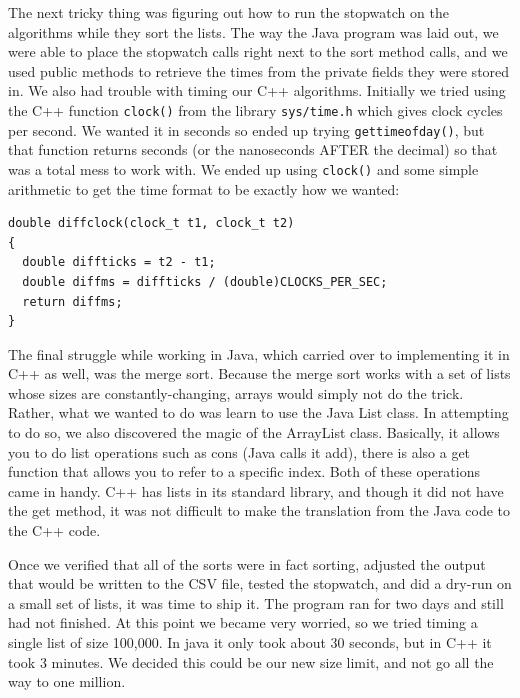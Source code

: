 \documentclass[12pt]{amsart}
\begin{document}
The next tricky thing was figuring out how to run the stopwatch on the 
algorithms while they sort the lists. The way the Java program was laid out, we were able to place the stopwatch calls right next to the sort method calls, and we used public methods to retrieve the times from the private fields they were stored in. We also had trouble with timing our C++ algorithms. Initially we tried using the C++ function \texttt{clock()} from the library \texttt{sys/time.h} which gives clock cycles per second. We wanted it in seconds so ended up trying \texttt{gettimeofday()}, but that function returns seconds (or the nanoseconds AFTER the decimal) so that was a total mess to work with. We ended up using \texttt{clock()} and some simple arithmetic to get the time format to be exactly how we wanted:
\linespread{1}
\begin{verbatim}
double diffclock(clock_t t1, clock_t t2)
{
  double diffticks = t2 - t1;
  double diffms = diffticks / (double)CLOCKS_PER_SEC;
  return diffms;
}
\end{verbatim}
\linespread{1.5}
The final struggle while working in Java, which carried over to implementing it
in C++ as well, was the merge sort. Because the merge sort works with a set of
lists whose sizes are constantly-changing, arrays would simply not do the trick.
Rather, what we wanted to do was learn to use the Java List class. In attempting
to do so, we also discovered the magic of the ArrayList class. Basically, it
allows you to do list operations such as cons (Java calls it add), there is also
a get function that allows you to refer to a specific index. Both of these
operations came in handy. C++ has lists in its standard library, and though it
did not have the get method, it was not difficult to make the translation from
the Java code to the C++ code.

Once we verified that all of the sorts were in fact sorting, adjusted the output
that would be written to the CSV file, tested the stopwatch, and did a dry-run
on a small set of lists, it was time to ship it. The program ran for two days
and still had not finished. At this point we became very worried, so we tried
timing a single list of size 100,000. In java it only took about 30 seconds, but
in C++ it took 3 minutes. We decided this could be our new size limit, and not
go all the way to one million.
\end{document}
